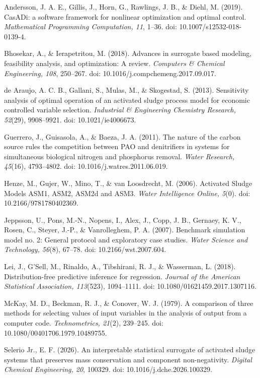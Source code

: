 \documentclass[a4paper,fleqn]{cas-sc}
\begin{document}
\noindent Andersson, J. A. E., Gillis, J., Horn, G., Rawlings, J. B., \& Diehl, M. (2019). CasADi: a software framework for nonlinear optimization and optimal control. \textit{Mathematical Programming Computation, 11}, 1--36. doi: 10.1007/s12532-018-0139-4.

\noindent Bhosekar, A., \& Ierapetritou, M. (2018). Advances in surrogate based modeling, feasibility analysis, and optimization: A review. \textit{Computers \& Chemical Engineering, 108}, 250--267. doi: 10.1016/j.compchemeng.2017.09.017.

\noindent de Araujo, A. C. B., Gallani, S., Mulas, M., \& Skogestad, S. (2013). Sensitivity analysis of optimal operation of an activated sludge process model for economic controlled variable selection. \textit{Industrial \& Engineering Chemistry Research, 52}(29), 9908--9921. doi: 10.1021/ie4006673.

\noindent Guerrero, J., Guisasola, A., \& Baeza, J. A. (2011). The nature of the carbon source rules the competition between PAO and denitrifiers in systems for simultaneous biological nitrogen and phosphorus removal. \textit{Water Research, 45}(16), 4793--4802. doi: 10.1016/j.watres.2011.06.019.

\noindent Henze, M., Gujer, W., Mino, T., \& van Loosdrecht, M. (2006). Activated Sludge Models ASM1, ASM2, ASM2d and ASM3. \textit{Water Intelligence Online, 5}(0). doi: 10.2166/9781780402369.

\noindent Jeppsson, U., Pons, M.-N., Nopens, I., Alex, J., Copp, J. B., Gernaey, K. V., Rosen, C., Steyer, J.-P., \& Vanrolleghem, P. A. (2007). Benchmark simulation model no. 2: General protocol and exploratory case studies. \textit{Water Science and Technology, 56}(8), 67--78. doi: 10.2166/wst.2007.604.

\noindent Lei, J., G'Sell, M., Rinaldo, A., Tibshirani, R. J., \& Wasserman, L. (2018). Distribution-free predictive inference for regression. \textit{Journal of the American Statistical Association, 113}(523), 1094--1111. doi: 10.1080/01621459.2017.1307116.

\noindent McKay, M. D., Beckman, R. J., \& Conover, W. J. (1979). A comparison of three methods for selecting values of input variables in the analysis of output from a computer code. \textit{Technometrics, 21}(2), 239--245. doi: 10.1080/00401706.1979.10489755.

\noindent Selerio Jr., E. F. (2026). An interpretable statistical surrogate of activated sludge systems that preserves mass conservation and component non-negativity. \textit{Digital Chemical Engineering, 20}, 100329. doi: 10.1016/j.dche.2026.100329.
\end{document}
